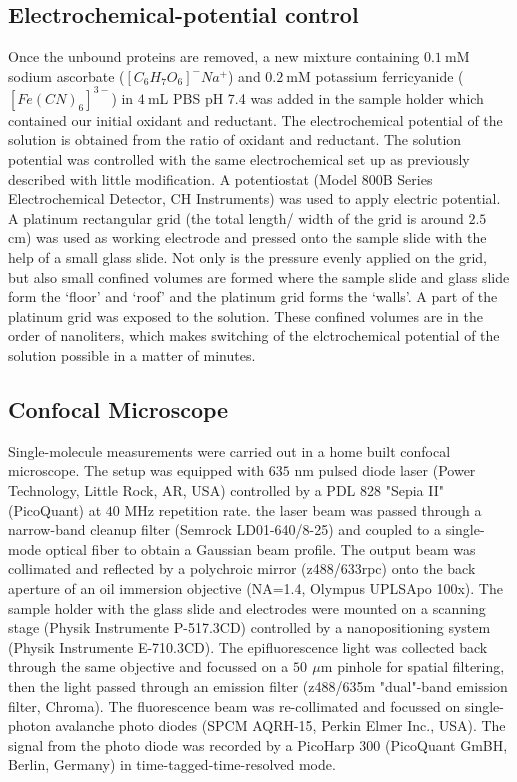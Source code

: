 \documentclass[journal=jacsat,manuscript=article]{achemso}
\newcommand{\um}{\ensuremath{\,\mu\textrm{m}}}
\begin{document}
\subsection{Electrochemical-potential control}
Once the unbound proteins are removed, a new mixture containing $0.1~$mM sodium ascorbate ($[C_6H_7O_6]^-Na^+$) and $0.2~$mM potassium ferricyanide ($[Fe(CN)_6]^{3-}$) in $4~$mL PBS pH 7.4 was added in the sample holder which contained our initial oxidant and reductant. The electrochemical potential of the solution is obtained from the ratio of oxidant and reductant. The solution potential was controlled with the same electrochemical set up as previously described\cite{zhang2017gold} with little modification. A potentiostat (Model 800B Series Electrochemical Detector, CH Instruments) was used to apply electric potential. A platinum rectangular grid (the total length/ width of the grid is around $2.5~$cm) was used as working electrode and pressed onto the sample slide with the help of a small glass slide. Not only is the pressure evenly applied on the grid, but also small confined volumes are formed where the sample slide and glass slide form the `floor' and `roof' and the platinum grid forms the `walls'. A part of the platinum grid was exposed to the solution. These confined volumes are in the order of nanoliters, which makes switching of the elctrochemical potential of the solution possible in a matter of minutes.
\subsection{Confocal Microscope}
Single-molecule measurements were carried out in a home built confocal microscope. The setup was equipped with $635$ nm pulsed diode laser (Power Technology, Little Rock, AR, USA) controlled by a PDL 828 "Sepia II" (PicoQuant) at $40$ MHz repetition rate. the laser beam was passed through a narrow-band cleanup filter (Semrock LD01-640/8-25) and coupled to a single-mode optical fiber to obtain a Gaussian beam profile. The output beam was collimated and reflected by a polychroic mirror (z488/633rpc) onto the back aperture of an oil immersion objective (NA=1.4, Olympus UPLSApo 100x). The sample holder with the glass slide and electrodes were mounted on a scanning stage (Physik Instrumente P-517.3CD) controlled by a nanopositioning system (Physik Instrumente E-710.3CD). The epifluorescence light was collected back through the same objective and focussed on a $50~\um$ pinhole for spatial filtering, then the light passed through an emission filter (z488/635m "dual"-band emission filter, Chroma). The fluorescence beam was re-collimated and focussed on single-photon avalanche photo diodes (SPCM AQRH-15, Perkin Elmer Inc., USA). The signal from the photo diode was recorded by a PicoHarp 300 (PicoQuant GmBH, Berlin, Germany) in time-tagged-time-resolved mode.
\end{document}
